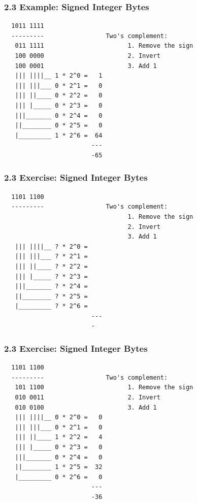 \begin{frame}[fragile]
  \frametitle{2.3 Example: Signed Integer Bytes}
  \begin{verbatim}
  1011 1111
  ---------                 Two's complement:
   011 1111                       1. Remove the sign
   100 0000                       2. Invert
   100 0001                       3. Add 1
   ||| ||||__ 1 * 2^0 =   1
   ||| |||___ 0 * 2^1 =   0
   ||| ||____ 0 * 2^2 =   0
   ||| |_____ 0 * 2^3 =   0
   |||_______ 0 * 2^4 =   0
   ||________ 0 * 2^5 =   0
   |_________ 1 * 2^6 =  64
                        ---
                        -65
  \end{verbatim}
\end{frame}


\begin{frame}[fragile]
  \frametitle{2.3 Exercise: Signed Integer Bytes}
  \begin{verbatim}
  1101 1100
  ---------                 Two's complement:
                                  1. Remove the sign
                                  2. Invert
                                  3. Add 1
   ||| ||||__ ? * 2^0 =
   ||| |||___ ? * 2^1 =
   ||| ||____ ? * 2^2 =
   ||| |_____ ? * 2^3 =
   |||_______ ? * 2^4 =
   ||________ ? * 2^5 =
   |_________ ? * 2^6 =
                        ---
                        -
  \end{verbatim}
\end{frame}


\begin{frame}[fragile]
  \frametitle{2.3 Exercise: Signed Integer Bytes}
  \begin{verbatim}
  1101 1100
  ---------                 Two's complement:
   101 1100                       1. Remove the sign
   010 0011                       2. Invert
   010 0100                       3. Add 1
   ||| ||||__ 0 * 2^0 =   0
   ||| |||___ 0 * 2^1 =   0
   ||| ||____ 1 * 2^2 =   4
   ||| |_____ 0 * 2^3 =   0
   |||_______ 0 * 2^4 =   0
   ||________ 1 * 2^5 =  32
   |_________ 0 * 2^6 =   0
                        ---
                        -36
  \end{verbatim}
\end{frame}


